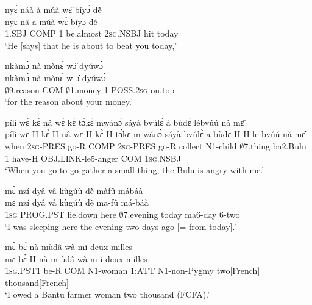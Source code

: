 \begin{exe} 
\exC\label{111}
  \glll  nyɛ̀ náà à múà wɛ̂ bíyɔ̀ dẽ́ \\
        nyɛ nâ a múà wɛ̀ bíyɔ dẽ́\\
           1.SBJ COMP 1 be.almost 2\textsc{sg}.NSBJ hit today \\
    \trans `He [says] that he is about to beat you today,'
\end{exe}

\begin{exe} 
\exC\label{112}
  \glll  nkàmɔ̀ nà mònɛ́ wɔ̂ dyúwɔ̀ \\
        nkàmɔ̀ nà mònɛ́ w-ɔ̂ dyúwɔ̀ \\
         $\emptyset$9.reason COM $\emptyset$1.money 1-POSS.2\textsc{sg} on.top  \\
    \trans `for the reason about your money.'
\end{exe}

\begin{exe} 
\exC\label{113} 
  \glll pílì wɛ́ kɛ́ nâ wɛ́ kɛ́ tɔ́kɛ̀ mwánɔ̀ sáyà bvúlɛ̀ à bùdɛ́ lébvúú nà mɛ̂ \\
        pílì wɛ-H kɛ̀-H nâ wɛ-H kɛ̀-H tɔ́kɛ m-wánɔ̀ sáyà bvúlɛ̀ a bùdɛ-H H-le-bvúú nà mɛ̂ \\
           when 2\textsc{sg}-PRES go-R COMP 2\textsc{sg}-PRES go-R collect N1-child $\emptyset$7.thing ba2.Bulu 1 have-H OBJ.LINK-le5-anger COM 1\textsc{sg}.NSBJ \\
    \trans `When you go to go gather a small thing, the Bulu is angry with me.'
\end{exe}

\begin{exe} 
\exC\label{114} 
  \glll  mɛ̀ nzí dyâ vâ kùgúù dẽ̀ màfû mábáà \\
     mɛ nzí dyâ vâ kùgúù dẽ̀ ma-fû má-báà \\
          1\textsc{sg} PROG.PST lie.down here $\emptyset$7.evening today ma6-day 6-two  \\
    \trans `I was sleeping here the evening two days ago [= from today].'
\end{exe}

\begin{exe} 
\exC\label{115}
  \glll  mɛ̀ bɛ́ nà mùdã̂ wà mí deux milles\\
        mɛ bɛ̀-H nà m-ùdã̂ wà m-í deux milles\\
          1\textsc{sg}.PST1 be-R COM N1-woman  1:ATT N1-non-Pygmy two[French] thousand[French]\\
    \trans `I owed a Bantu farmer woman two thousand (FCFA).'
\end{exe}

